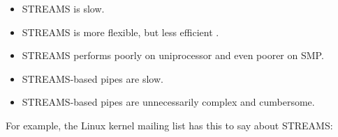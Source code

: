 \documentclass[letterpaper,final,notitlepage,twocolumn,10pt,twoside]{article}
\begin{document}
\begin{itemize}

\item STREAMS is slow.

\item STREAMS is more flexible, but less efficient \cite[]{lkmlfaq}.

\item STREAMS performs poorly on uniprocessor and even poorer on SMP.

\item STREAMS-based pipes are slow.

\item STREAMS-based pipes are unnecessarily complex and cumbersome.

\end{itemize}

For example, the Linux kernel mailing list has this to say about STREAMS:
\end{document}
